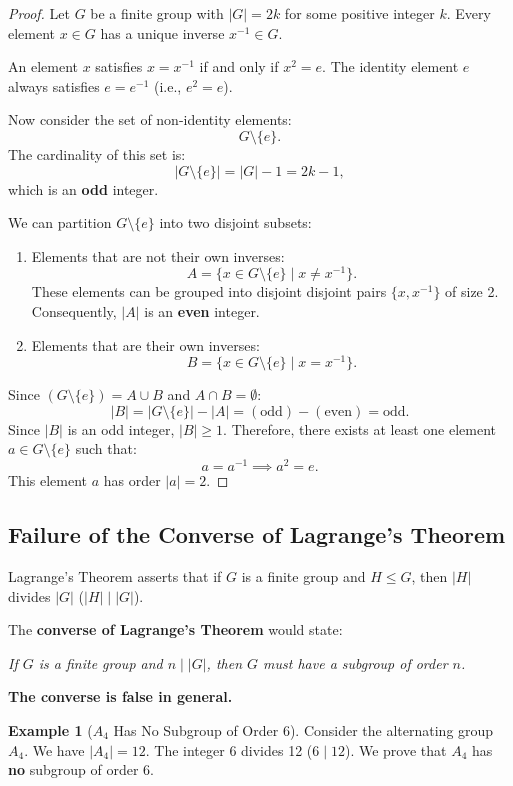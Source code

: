 \documentclass[12pt]{article}
\theoremstyle{definition}
\newtheorem{example}[definition]{Example}
\theoremstyle{plain}
\begin{document}
\begin{proof}
Let $G$ be a finite group with $|G| = 2k$ for some positive integer $k$.
Every element $x \in G$ has a unique inverse $x^{-1} \in G$.

An element $x$ satisfies $x = x^{-1}$ if and only if $x^2 = e$.
The identity element $e$ always satisfies $e = e^{-1}$ (i.e., $e^2 = e$).

Now consider the set of non-identity elements:
\[
G \setminus \{e\}.
\]
The cardinality of this set is:
\[
|G \setminus \{e\}| = |G| - 1 = 2k - 1,
\]
which is an \textbf{odd} integer.

We can partition $G \setminus \{e\}$ into two disjoint subsets:
\begin{enumerate}
    \item Elements that are not their own inverses:
    \[
    A = \{ x \in G \setminus \{e\} \mid x \neq x^{-1} \}.
    \]
    These elements can be grouped into disjoint disjoint pairs $\{x, x^{-1}\}$ of size 2. Consequently, $|A|$ is an \textbf{even} integer.
    
    \item Elements that are their own inverses:
    \[
    B = \{ x \in G \setminus \{e\} \mid x = x^{-1} \}.
    \]
\end{enumerate}
Since $(G \setminus \{e\}) = A \cup B$ and $A \cap B = \emptyset$:
\[
|B| = |G \setminus \{e\}| - |A| = (\text{odd}) - (\text{even}) = \text{odd}.
\]
Since $|B|$ is an odd integer, $|B| \ge 1$.
Therefore, there exists at least one element $a \in G \setminus \{e\}$ such that:
\[
a = a^{-1} \implies a^2 = e.
\]
This element $a$ has order $|a| = 2$.
\end{proof}

\subsection{Failure of the Converse of Lagrange's Theorem}

Lagrange's Theorem asserts that if $G$ is a finite group and $H \le G$, then $|H|$ divides $|G|$ ($|H| \mid |G|$).

The \textbf{converse of Lagrange's Theorem} would state:
\begin{center}
\textit{If $G$ is a finite group and $n \mid |G|$, then $G$ must have a subgroup of order $n$.}
\end{center}
\textbf{The converse is false in general.}

\begin{example}[$A_4$ Has No Subgroup of Order 6]
Consider the alternating group $A_4$.
We have $|A_4| = 12$.
The integer 6 divides 12 ($6 \mid 12$).
We prove that $A_4$ has \textbf{no} subgroup of order 6.
\end{example}
\end{document}
